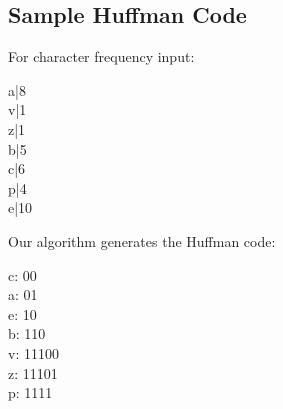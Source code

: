 \documentclass[11pt]{article}
\begin{document}
\subsection*{Sample Huffman Code}

For character frequency input:

a|8 \\
v|1 \\
z|1 \\
b|5 \\
c|6 \\
p|4 \\
e|10

Our algorithm generates the Huffman code:

c: 00 \\
a: 01 \\
e: 10 \\
b: 110 \\
v: 11100 \\
z: 11101 \\
p: 1111 \\
\end{document}
